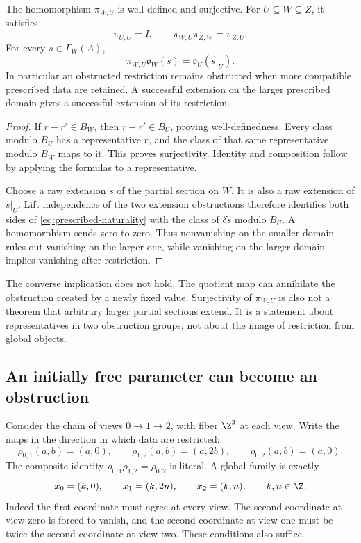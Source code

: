 \begin{theorem}\label{KS59}
The homomorphism \(\pi_{W,U}\) is well defined and surjective. For \(U\subseteq W\subseteq Z\), it satisfies
\[
 \pi_{U,U}=I,\qquad \pi_{W,U}\pi_{Z,W}=\pi_{Z,U}.
\]
For every \(s\in\Gamma_W(A)\),
\begin{equation}\label{eq:prescribed-naturality}
 \pi_{W,U}\mathfrak o_W(s)=\mathfrak o_U(s|_U).
\end{equation}
In particular an obstructed restriction remains obstructed when more compatible prescribed data are retained. A successful extension on the larger prescribed domain gives a successful extension of its restriction.
\end{theorem}
\begin{proof}
If \(r-r'\in B_W\), then \(r-r'\in B_U\), proving well-definedness. Every class modulo \(B_U\) has a representative \(r\), and the class of that same representative modulo \(B_W\) maps to it. This proves surjectivity. Identity and composition follow by applying the formulas to a representative.

Choose a raw extension \(\widetilde s\) of the partial section on \(W\). It is also a raw extension of \(s|_U\). Lift independence of the two extension obstructions therefore identifies both sides of \eqref{eq:prescribed-naturality} with the class of \(\delta\widetilde s\) modulo \(B_U\). A homomorphism sends zero to zero. Thus nonvanishing on the smaller domain rules out vanishing on the larger one, while vanishing on the larger domain implies vanishing after restriction.
\end{proof}
The converse implication does not hold. The quotient map can annihilate the obstruction created by a newly fixed value. Surjectivity of \(\pi_{W,U}\) is also not a theorem that arbitrary larger partial sections extend. It is a statement about representatives in two obstruction groups, not about the image of restriction from global objects.

\subsection{An initially free parameter can become an obstruction}
Consider the chain of views \(0\to1\to2\), with fiber \(\Z^2\) at each view. Write the maps in the direction in which data are restricted:
\[
 \rho_{0,1}(a,b)=(a,0),\qquad
 \rho_{1,2}(a,b)=(a,2b),\qquad
 \rho_{0,2}(a,b)=(a,0).
\]
The composite identity \(\rho_{0,1}\rho_{1,2}=\rho_{0,2}\) is literal. A global family is exactly
\begin{equation}\label{eq:branch-family}
 x_0=(k,0),\qquad x_1=(k,2n),\qquad x_2=(k,n),
 \qquad k,n\in\Z.
\end{equation}
Indeed the first coordinate must agree at every view. The second coordinate at view zero is forced to vanish, and the second coordinate at view one must be twice the second coordinate at view two. These conditions also suffice.

